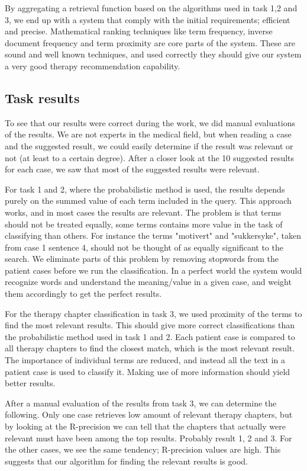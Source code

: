 By aggregating a retrieval function based on the algorithms used in task 1,2 and 3, we end up with a system that comply with the initial requirements; efficient and precise. Mathematical ranking techniques like term frequency, inverse document frequency and term proximity are core parts of the system. These are sound and well known techniques, and used correctly they should give our system a very good therapy recommendation capability.

\subsection{Task results}
To see that our results were correct during the work, we did manual evaluations of the results. We are not experts in the medical field, but when reading a case and the suggested result, we could easily determine if the result was relevant or not (at least to a certain degree). After a closer look at the 10 suggested results for each case, we saw that most of the suggested results were relevant.

For task 1 and 2, where the probabilistic method is used, the results depends purely on the summed value of each term included in the query. This approach works, and in most cases the results are relevant. The problem is that terms should not be treated equally, some terms contains more value in the task of classifying than others. For instance the terms "motivert" and "sukkersyke", taken from case 1 sentence 4, should not be thought of as equally significant to the search. We eliminate parts of this problem by removing stopwords from the patient cases before we run the classification. In a perfect world the system would recognize words and understand the meaning/value in a given case, and weight them accordingly to get the perfect results. 

For the therapy chapter classification in task 3, we used proximity of the terms to find the most relevant results. This should give more correct classifications than the probabilistic method used in task 1 and 2. Each patient case is compared to all therapy chapters to find the closest match, which is the most relevant result. The importance of individual terms are reduced, and instead all the text in a patient case is used to classify it. Making use of more information should yield better results.

After a manual evaluation of the results from task 3, we can determine the following. Only one case retrieves low amount of relevant therapy chapters, but by looking at the R-precision we can tell that the chapters that actually were relevant must have been among the top results. Probably result 1, 2 and 3. For the other cases, we see the same tendency; R-precision values are high. This suggests that our algorithm for finding the relevant results is good. 

